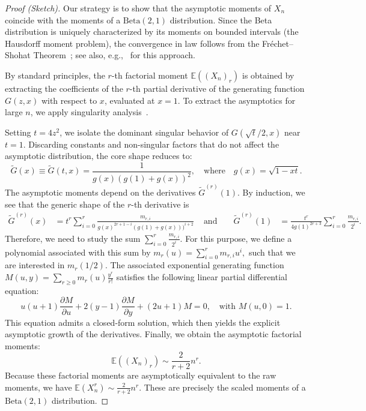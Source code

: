 \documentclass[a4paper,UKenglish,cleveref, autoref, thm-restate]{lipics-v2021}
\newcommand{\E}{\mathbb{E}}
\begin{document}
\newcommand{\tG}{\tilde{G}}
\begin{proof}[Proof (Sketch)]
Our strategy is to show that the asymptotic moments of $X_n$ coincide with the moments of a $\mathrm{Beta}(2,1)$ distribution. Since the Beta distribution is uniquely characterized by its moments on bounded intervals (the Hausdorff moment problem), the convergence in law follows from the Fr{\'e}chet--Shohat Theorem~\cite{FrechetShohat1931Moments}; see also, e.g.,~\cite{BanderierEtal2024ML} for this approach.

By standard principles, the $r$-th factorial moment $\E((X_n)_r)$ is obtained by extracting the coefficients of the $r$-th partial derivative of the generating function $G(z,x)$ with respect to $x$, evaluated at $x=1$. To extract the asymptotics for large $n$, we apply singularity analysis~\cite{FlajoletSedgewick2009AC}.

Setting $t=4z^2$, we isolate the dominant singular behavior of $G(\sqrt{t}/2,x)$ near $t=1$. Discarding constants and non-singular factors that do not affect the asymptotic distribution, the core shape reduces to:
\[
    \tG(x) \equiv \tG(t,x) = \frac{1}{g(x)(g(1)+g(x))^2}, \quad \text{where} \quad g(x) = \sqrt{1-xt}.
\]
The asymptotic moments depend on the derivatives $\tG^{(r)}(1)$. 
By induction, we see that the generic shape of the $r$-th derivative is
\begin{align*}
    \tG^{(r)}(x) &= t^r \sum_{i=0}^r \frac{m_{r,i}}{g(x)^{2r+1-i} (g(1)+g(x)))^{i+2}}
    & \text{ and } &&
    \tG^{(r)}(1) &= \frac{t^r}{4 g(1)^{2r+3}} \sum_{i=0}^r \frac{m_{r,i}}{2^{i}}.
\end{align*}
Therefore, we need to study the sum $\sum_{i=0}^r \frac{m_{r,i}}{2^{i}}$. 
For this purpose, we define a polynomial associated with this sum by
$
    m_r(u) = \sum_{i=0}^r m_{r,i} u^i,
$
such that we are interested in $m_r(1/2)$.
The associated exponential generating function $M(u,y) = \sum_{r \ge 0} m_r(u) \frac{y^r}{r!}$ satisfies the following linear partial differential equation:
\[
    u(u+1) \frac{\partial M}{\partial u} + 2(y-1)\frac{\partial M}{\partial y} + (2u+1) M = 0, \quad \text{with } M(u,0)=1.
\]
This equation admits a closed-form solution, which then yields the explicit asymptotic growth of the derivatives. Finally, we obtain the asymptotic factorial moments:
\[
    \E((X_n)_r) \sim \frac{2}{r+2} n^r.
\]
Because these factorial moments are asymptotically equivalent to the raw moments, we have $\E(X_n^r) \sim \frac{2}{r+2} n^r$. These are precisely the scaled moments of a $\mathrm{Beta}(2,1)$ distribution.
\end{proof}
\end{document}
